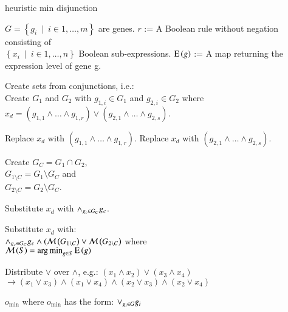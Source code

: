 \begin{algorithm} 
\caption{heuristic min disjunction}
\label{alg:HeuristicToCNF}
\begin{algorithmic}
\INPUT $G = \left\{g_i~\mid~i \in{1, \ldots, m}\right\}$ are genes. 
\INPUT $r$ := A Boolean rule without negation consisting of\\
  $\left\{x_i~\mid~i \in{1, \ldots, n}\right\}$ Boolean sub-expressions.
\INPUT $\operatorname{E}\left(g\right)$ := A map returning the expression level of gene g.
  \State \parbox[t]{\dimexpr\linewidth-\algorithmicindent}{
    Create sets from conjunctions, i.e.:\\
    Create $G_1$ and $G_2$ with $g_{1,i} \in G_1$ 
    and $g_{2,i} \in G_2$ where\\ 
    $x_d = (g_{1,1} \land \ldots \land g_{1,r}) \lor 
    (g_{2,1} \land \ldots \land g_{2,s})$. 
    \strut}
    \State Replace $x_d$ with $(g_{1,1} \land \ldots \land g_{1,r})$.
    \State Replace $x_d$ with $(g_{2,1} \land \ldots \land g_{2,s})$.
    \Else
    \State \parbox[t]{\dimexpr\linewidth-\algorithmicindent}{
      Create $G_C = G_1 \cap G_2$, \\
      $G_{1\setminus C} = G_1 \setminus G_C$ and\\ 
      $G_{2\setminus C} = G_2 \setminus G_C$. 
      \strut}
        \State Substitute $x_d$ with $\land_{g_c \in G_C} g_c$.
      \Else
        \State \parbox[t]{\dimexpr\linewidth-\algorithmicindent}{Substitute $x_d$ with:\\
          $\land_{g_c \in G_C} g_c \land (\mathcal{M}\left(G_{1 \setminus C}\right) \lor 
          \mathcal{M}\left(G_{2\setminus C}\right)$ where\\
          $\mathcal{M}\left(S\right) = \operatorname*{arg\,min}_{g \in S}{\operatorname{E}\left(g\right)}$
          \strut}
      \EndIf
    \EndIf
  \EndIf
  \State \parbox[t]{\dimexpr\linewidth-\algorithmicindent}{
    Distribute $\lor$ over $\land$, e.g.: $(x_1 \land x_2) \lor (x_3 \land x_4)$ \\ 
    $\rightarrow (x_1 \lor x_3) \land (x_1 \lor x_4) \land 
    (x_2 \lor x_3) \land (x_2 \lor x_4)$
    \strut}
\EndWhile
\OUTPUT $o_{\min}$ where $o_{\min}$ has the form: $\lor_{g_i \in G} g_i$
\end{algorithmic} 
\end{algorithm} 

